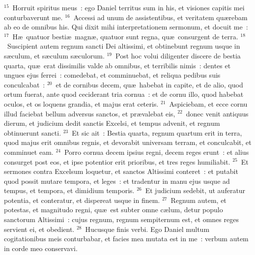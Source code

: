 ${}^{15}$~Horruit spiritus meus~: ego Daniel territus sum in his, et visiones capitis mei conturbaverunt me.
${}^{16}$~Accessi ad unum de assistentibus, et veritatem qu\ae rebam ab eo de omnibus his. Qui dixit mihi interpretationem sermonum, et docuit me~:
${}^{17}$~H\ae\ quatuor besti\ae\ magn\ae , quatuor sunt regna, qu\ae\ consurgent de terra.
${}^{18}$~Suscipient autem regnum sancti Dei altissimi, et obtinebunt regnum usque in s\ae culum, et s\ae culum s\ae culorum.
${}^{19}$~Post hoc volui diligenter discere de bestia quarta, qu\ae\ erat dissimilis valde ab omnibus, et terribilis nimis~: dentes et ungues ejus ferrei~: comedebat, et comminuebat, et reliqua pedibus suis conculcabat~:
${}^{20}$~et de cornibus decem, qu\ae\ habebat in capite, et de alio, quod ortum fuerat, ante quod ceciderant tria cornua~: et de cornu illo, quod habebat oculos, et os loquens grandia, et majus erat ceteris.
${}^{21}$~Aspiciebam, et ecce cornu illud faciebat bellum adversus sanctos, et pr\ae valebat eis,
${}^{22}$~donec venit antiquus dierum, et judicium dedit sanctis Excelsi, et tempus advenit, et regnum obtinuerunt sancti.
${}^{23}$~Et sic ait~: Bestia quarta, regnum quartum erit in terra, quod majus erit omnibus regnis, et devorabit universam terram, et conculcabit, et comminuet eam.
${}^{24}$~Porro cornua decem ipsius regni, decem reges erunt~: et alius consurget post eos, et ipse potentior erit prioribus, et tres reges humiliabit.
${}^{25}$~Et sermones contra Excelsum loquetur, et sanctos Altissimi conteret~: et putabit quod possit mutare tempora, et leges~: et tradentur in manu ejus usque ad tempus, et tempora, et dimidium temporis.
${}^{26}$~Et judicium sedebit, ut auferatur potentia, et conteratur, et dispereat usque in finem.
${}^{27}$~Regnum autem, et potestas, et magnitudo regni, qu\ae\ est subter omne c\ae lum, detur populo sanctorum Altissimi~: cujus regnum, regnum sempiternum est, et omnes reges servient ei, et obedient.
${}^{28}$~Hucusque finis verbi. Ego Daniel multum cogitationibus meis conturbabar, et facies mea mutata est in me~: verbum autem in corde meo conservavi.

